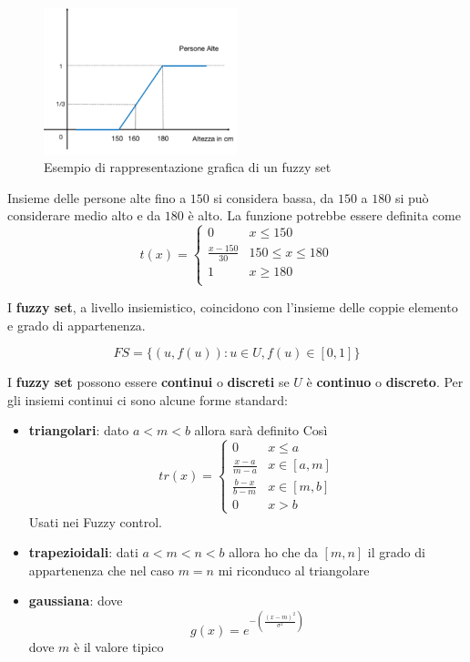 \begin{figure}[!h]
    \centering
    \includegraphics[width=0.5\textwidth]{img/sistemi_incerti/fuzzy.png}
    \caption{Esempio di rappresentazione grafica di un fuzzy set}
    \label{fig:fuzzy_set}
\end{figure}    
\begin{esempio}
    Insieme delle persone alte fino a $150$ si considera bassa,
    da $150$ a $180$ si può considerare medio alto e da $180$ è alto.
    La funzione potrebbe essere definita come 
    $$t(x) = \begin{cases}
        0& x\le 150\\
        \frac{x-150}{30}& 150\le x\le 180\\
        1& x\ge 180\\
    \end{cases}$$
\end{esempio}

I \textbf{fuzzy set}, a livello insiemistico, coincidono con l'insieme delle coppie 
elemento e grado di appartenenza. 

$$FS=\{(u, f(u)): u\in U, f(u)\in [0,1]\}$$

I \textbf{fuzzy set} possono essere \textbf{continui} o \textbf{discreti} se 
$U$ è \textbf{continuo} o \textbf{discreto}. Per gli insiemi continui ci sono alcune forme standard:
\begin{itemize}
    \item \textbf{triangolari}: dato $a<m<b$ allora sarà definito Così
    $$tr(x) = \begin{cases}
        0& x\le a\\
        \frac{x-a}{m-a} & x\in [a,m]\\
        \frac{b-x}{b-m} & x\in [m,b]\\
        0&x>b
    \end{cases}$$
    Usati nei Fuzzy control.
    \item \textbf{trapezioidali}: dati $a<m<n<b$ allora ho che da $[m,n]$ il grado
    di appartenenza che nel caso $m=n$ mi riconduco al triangolare
    \item \textbf{gaussiana}: dove
    $$g(x) = e^{-(\frac{(x-m)^2}{\sigma^2})}$$
    dove $m$ è il valore tipico 
\end{itemize}

